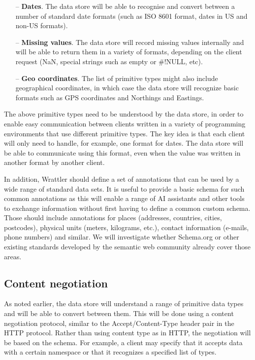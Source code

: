 \documentclass[sigplan,preprint,10pt]{acmart}\settopmatter{printfolios=true,printccs=false,printacmref=false}
\begin{document}
{\begin{itemize}
\item[--] \textbf{Dates}. The data store will be able to recognise and convert between a number of
  standard date formats (such as ISO 8601 format, dates in US and non-US formats).

\item[--] \textbf{Missing values}. The data store will record missing values internally and will be
  able to return them in a variety of formats, depending on the client request (NaN, special 
  strings such as empty or \#!NULL, etc).
   
\item[--] \textbf{Geo coordinates}. The list of primitive types might also include geographical
  coordinates, in which case the data store will recognize basic formats such as GPS coordinates  and Northings and Eastings.  

\end{itemize}

\noindent
The above primitive types need to be understood by the data store, in order to enable easy
communication between clients written in a variety of programming environments that use different
primitive types. The key idea is that each client will only need to handle, for example, one format 
for dates. The data store will be able to communicate using this format, even when the value was
written in another format by another client.

In addition, Wrattler should define a set of annotations that can be used by a wide range of
standard data sets. It is useful to provide a basic schema for such common annotations as this
will enable a range of AI assistants and other tools to exchange information without first having
to define a common custom schema. Those should include annotations for places (addresses, 
countries, cities, postcodes), physical units (meters, kilograms, etc.), contact information
(e-mails, phone numbers) and similar. We will investigate whether Schema.org or other existing
standards developed by the semantic web community already cover those areas.

\subsection{Content negotiation}
\label{sec:datastore-negotiation}

As noted earlier, the data store will understand a range of primitive data types and will be 
able to convert between them. This will be done using a content negotiation protocol,
similar to the Accept/Content-Type header pair in the HTTP protocol. Rather than using 
content type as in HTTP, the negotiation will be based on the schema. For example, a client may
specify that it accepts data with a certain namespace or that it recognizes a specified list of
types.

}
\end{document}

